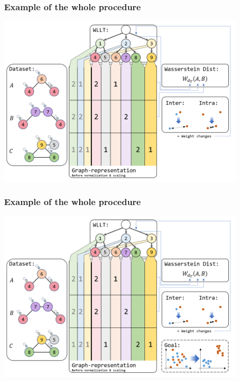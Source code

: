 \begin{frame}[noframenumbering]
	\frametitle{Example of the whole procedure}\vspace{-0.75cm}
	\centering
	\includegraphics[width=0.9\textwidth]{images/WLLTProgram5}
\end{frame}

\begin{frame}[noframenumbering]
	\frametitle{Example of the whole procedure}\vspace{-0.75cm}
	\centering
	\includegraphics[width=0.9\textwidth]{images/WLLTProgram6}
\end{frame}



